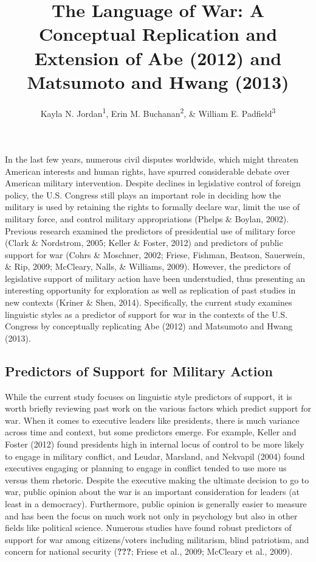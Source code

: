\documentclass[
  english,
  ,man,floatsintext]{apa6}
\author{Kayla N. Jordan\textsuperscript{1}, Erin M. Buchanan\textsuperscript{2}, \& William E. Padfield\textsuperscript{3}}
\affiliation{
\vspace{0.5cm}
\textsuperscript{1} University of Texas - Austin\\\textsuperscript{2} Harrisburg University of Science and Technology\\\textsuperscript{3} Missouri State University}
\title{The Language of War: A Conceptual Replication and Extension of Abe (2012) and Matsumoto and Hwang (2013)}
\date{}
\begin{document}
\maketitle

In the last few years, numerous civil disputes worldwide, which might threaten American interests and human rights, have spurred considerable debate over American military intervention. Despite declines in legislative control of foreign policy, the U.S. Congress still plays an important role in deciding how the military is used by retaining the rights to formally declare war, limit the use of military force, and control military appropriations (Phelps \& Boylan, 2002). Previous research examined the predictors of presidential use of military force (Clark \& Nordstrom, 2005; Keller \& Foster, 2012) and predictors of public support for war (Cohrs \& Moschner, 2002; Friese, Fishman, Beatson, Sauerwein, \& Rip, 2009; McCleary, Nalls, \& Williams, 2009). However, the predictors of legislative support of military action have been understudied, thus presenting an interesting opportunity for exploration as well as replication of past studies in new contexts (Kriner \& Shen, 2014). Specifically, the current study examines linguistic styles as a predictor of support for war in the contexts of the U.S. Congress by conceptually replicating Abe (2012) and Matsumoto and Hwang (2013).

\hypertarget{predictors-of-support-for-military-action}{%
\subsection{Predictors of Support for Military Action}\label{predictors-of-support-for-military-action}}

While the current study focuses on linguistic style predictors of support, it is worth briefly reviewing past work on the various factors which predict support for war. When it comes to executive leaders like presidents, there is much variance across time and context, but some predictors emerge. For example, Keller and Foster (2012) found presidents high in internal locus of control to be more likely to engage in military conflict, and Leudar, Marsland, and Nekvapil (2004) found executives engaging or planning to engage in conflict tended to use more us versus them rhetoric. Despite the executive making the ultimate decision to go to war, public opinion about the war is an important consideration for leaders (at least in a democracy). Furthermore, public opinion is generally easier to measure and has been the focus on much work not only in psychology but also in other fields like political science. Numerous studies have found robust predictors of support for war among citizens/voters including militarism, blind patriotism, and concern for national security ({\textbf{???}}; Friese et al., 2009; McCleary et al., 2009).
\end{document}
